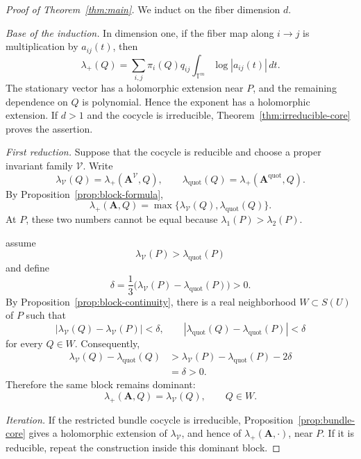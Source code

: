 \documentclass[11pt,a4paper]{amsart}
\newcommand{\T}{\mathbb T}
\begin{document}
\begin{proof}[Proof of Theorem~\ref{thm:main}]
We induct on the fiber dimension \(d\).

\smallskip
\noindent\emph{Base of the induction.}
In dimension one, if the fiber map along \(i\to j\) is multiplication
by \(a_{ij}(t)\), then
\[
 \lambda_+(Q)
 =
 \sum_{i,j}\pi_i(Q)q_{ij}
 \int_{\T^m}\log|a_{ij}(t)|\,dt.
\]
The stationary vector has a holomorphic extension near \(P\), and the
remaining dependence on \(Q\) is polynomial.  Hence the exponent has
a holomorphic extension.  If \(d>1\) and the cocycle is irreducible,
Theorem~\ref{thm:irreducible-core} proves the assertion.

\smallskip
\noindent\emph{First reduction.}
Suppose that the cocycle is reducible and choose a proper invariant
family \(\boldsymbol{\mathcal V}\).  Write
\[
 \lambda_{\mathcal V}(Q)
 =\lambda_+(\mathbf A^{\boldsymbol{\mathcal V}},Q),
 \qquad
 \lambda_{\mathrm{quot}}(Q)
 =\lambda_+(\mathbf A^{\mathrm{quot}},Q).
\]
By Proposition~\ref{prop:block-formula},
\[
 \lambda_+(\mathbf A,Q)
 =\max\{\lambda_{\mathcal V}(Q),
        \lambda_{\mathrm{quot}}(Q)\}.
\]
At \(P\), these two numbers cannot be equal%
because \(\lambda_1(P)>\lambda_2(P)\).

assume
\[
 \lambda_{\mathcal V}(P)>
 \lambda_{\mathrm{quot}}(P)
\]
and define
\[
 \delta=
 \frac13\bigl(
 \lambda_{\mathcal V}(P)
 -\lambda_{\mathrm{quot}}(P)\bigr)>0.
\]
By Proposition~\ref{prop:block-continuity}, there is a real
neighborhood \(W\subset S(U)\) of \(P\) such that
\[
 |\lambda_{\mathcal V}(Q)-\lambda_{\mathcal V}(P)|<\delta,
 \qquad
 |\lambda_{\mathrm{quot}}(Q)-\lambda_{\mathrm{quot}}(P)|<\delta
\]
for every \(Q\in W\).  Consequently,
\[
\begin{aligned}
 \lambda_{\mathcal V}(Q)-\lambda_{\mathrm{quot}}(Q)
 &>
 \lambda_{\mathcal V}(P)-\lambda_{\mathrm{quot}}(P)-2\delta\\
 &=\delta>0.
\end{aligned}
\]
Therefore the same block remains dominant:
\[
 \lambda_+(\mathbf A,Q)=\lambda_{\mathcal V}(Q),
 \qquad Q\in W.
\]

\smallskip
\noindent\emph{Iteration.}
If the restricted bundle cocycle is irreducible,
Proposition~\ref{prop:bundle-core} gives a holomorphic extension of
\(\lambda_{\mathcal V}\), and hence of
\(\lambda_+(\mathbf A,\cdot)\), near \(P\).  If it is reducible,
repeat the construction inside this dominant block.


\end{proof}
\end{document}
